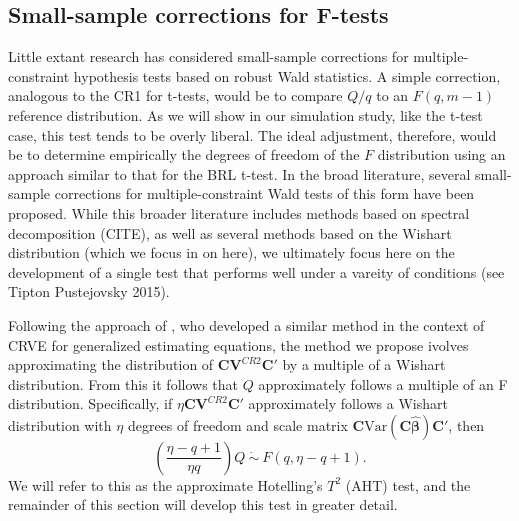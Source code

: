 \documentclass[12pt]{article}\usepackage[]{graphicx}\usepackage[]{color}
\newcommand{\Var}{\text{Var}}
\newcommand{\bm}{\mathbf}
\newcommand{\bs}{\boldsymbol}
\begin{document}
\subsection{Small-sample corrections for F-tests}

Little extant research has considered small-sample corrections for multiple-constraint hypothesis tests based on robust Wald statistics.
A simple correction, analogous to the CR1 for t-tests, would be to compare $Q / q$ to an $F(q, m - 1)$ reference distribution. 
As we will show in our simulation study, like the t-test case, this test tends to be overly liberal. 
The ideal adjustment, therefore, would be to determine empirically the degrees of freedom of the $F$ distribution using an approach similar to that for the BRL t-test. In the broad literature, several small-sample corrections for multiple-constraint Wald tests of this form have been proposed. 
While this broader literature includes methods based on spectral decomposition (CITE), as well as several methods based on the Wishart distribution (which we focus in on here), we ultimately focus here on the development of a single test that performs well under a vareity of conditions (see Tipton Pustejovsky 2015). 

Following the approach of \cite{Pan2002small}, who developed a similar method in the context of CRVE for generalized estimating equations, the method we propose ivolves approximating the distribution of $\bm{C}\bm{V}^{CR2} \bm{C}'$ by a multiple of a Wishart distribution. From this it follows that $Q$ approximately follows a multiple of an F distribution. Specifically, if $\eta \bm{C}\bm{V}^{CR2} \bm{C}'$ approximately follows a Wishart distribution with $\eta$ degrees of freedom and scale matrix $\bm{C} \Var\left(\bm{C}\bs{\hat\beta}\right)\bm{C}'$, then 
\begin{equation}
\label{eq:AHT}
\left(\frac{\eta - q + 1}{\eta q}\right) Q \ \dot\sim \ F(q, \eta - q + 1).
\end{equation}
We will refer to this as the approximate Hotelling's $T^2$ (AHT) test, and the remainder of this section will develop this test in greater detail.
\end{document}

